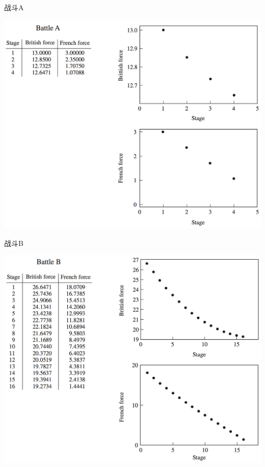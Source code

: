 \documentclass[UTF8]{ctexbeamer}
\begin{document}
\begin{frame}{战斗A}
  \begin{center}
    \includegraphics[height=.9\textheight{}]{fight-A.png}
  \end{center}  
\end{frame}

\begin{frame}{战斗B}
  \begin{center}
    \includegraphics[height=.9\textheight{}]{fight-B.png}
  \end{center}  
\end{frame}
\end{document}
